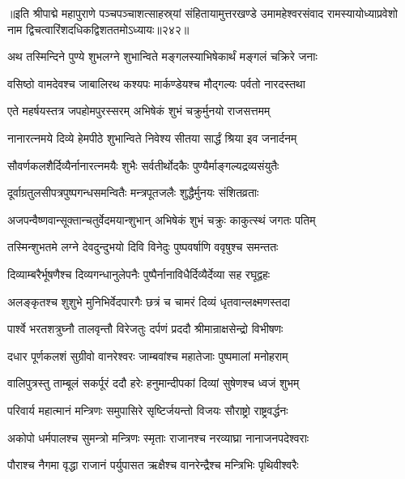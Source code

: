 {॥इति श्रीपाद्मे महापुराणे पञ्चपञ्चाशत्साहस्र्यां संहितायामुत्तरखण्डे उमामहेश्वरसंवाद रामस्यायोध्याप्रवेशो नाम द्विचत्वारिंशदधिकद्विशततमोऽध्यायः॥२४२॥}



\twolineshloka
{अथ तस्मिन्दिने पुण्ये शुभलग्ने शुभान्विते}
{मङ्गलस्याभिषेकार्थं मङ्गलं चक्रिरे जनाः}%

\twolineshloka
{वसिष्ठो वामदेवश्च जाबालिरथ कश्यपः}
{मार्कण्डेयश्च मौद्गल्यः पर्वतो नारदस्तथा}%

\twolineshloka
{एते महर्षयस्तत्र जपहोमपुरस्सरम्}
{अभिषेकं शुभं चक्रुर्मुनयो राजसत्तमम्}%

\twolineshloka
{नानारत्नमये दिव्ये हेमपीठे शुभान्विते}
{निवेश्य सीतया सार्द्धं श्रिया इव जनार्दनम्}%

\twolineshloka
{सौवर्णकलशैर्दिव्यैर्नानारत्नमयैः शुभैः}
{सर्वतीर्थोदकैः पुण्यैर्माङ्गल्यद्रव्यसंयुतैः}%

\twolineshloka
{दूर्वाग्रतुलसीपत्रपुष्पगन्धसमन्वितैः}
{मन्त्रपूतजलैः शुद्धैर्मुनयः संशितव्रताः}%

\twolineshloka
{अजपन्वैष्णवान्सूक्तान्चतुर्वेदमयान्शुभान्}
{अभिषेकं शुभं चक्रुः काकुत्स्थं जगतः पतिम्}%

\twolineshloka
{तस्मिन्शुभतमे लग्ने देवदुन्दुभयो दिवि}
{विनेदुः पुष्पवर्षाणि ववृषुश्च समन्ततः}%

\twolineshloka
{दिव्याम्बरैर्भूषणैश्च दिव्यगन्धानुलेपनैः}
{पुष्पैर्नानाविधैर्दिव्यैर्देव्या सह रघूद्वहः}%

\twolineshloka
{अलङ्कृतश्च शुशुभे मुनिभिर्वेदपारगैः}
{छत्रं च चामरं दिव्यं धृतवान्लक्ष्मणस्तदा}%

\twolineshloka
{पार्श्वे भरतशत्रुघ्नौ तालवृन्तौ विरेजतुः}
{दर्पणं प्रददौ श्रीमान्राक्षसेन्द्रो विभीषणः}%

\twolineshloka
{दधार पूर्णकलशं सुग्रीवो वानरेश्वरः}
{जाम्बवांश्च महातेजाः पुष्पमालां मनोहराम्}%

\twolineshloka
{वालिपुत्रस्तु ताम्बूलं सकर्पूरं ददौ हरेः}
{हनुमान्दीपकां दिव्यां सुषेणश्च ध्वजं शुभम्}%

\twolineshloka
{परिवार्य महात्मानं मन्त्रिणः समुपासिरे}
{सृष्टिर्जयन्तो विजयः सौराष्ट्रो राष्ट्रवर्द्धनः}%

\twolineshloka
{अकोपो धर्मपालश्च सुमन्त्रो मन्त्रिणः स्मृताः}
{राजानश्च नरव्याघ्रा नानाजनपदेश्वराः}%

\twolineshloka
{पौराश्च नैगमा वृद्धा राजानं पर्युपासत}
{ऋक्षैश्च वानरेन्द्रैश्च मन्त्रिभिः पृथिवीश्वरैः}%

